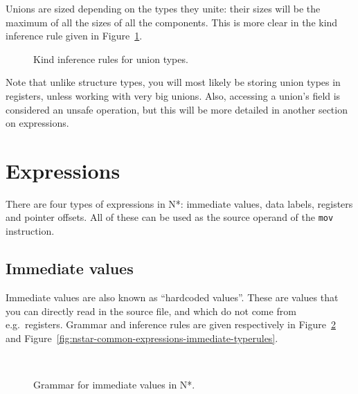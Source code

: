 Unions are sized depending on the types they unite: their sizes will be the maximum of all the sizes of all the components.
This is more clear in the kind inference rule given in Figure~\ref{fig:nstar-common-ts-unions-kindrules}.

\begin{figure}[htb]
  \centering

  \begin{prooftree}
  \end{prooftree}

  \caption{Kind inference rules for union types.}
  \label{fig:nstar-common-ts-unions-kindrules}
\end{figure}

Note that unlike structure types, you will most likely be storing union types in registers, unless working with very big unions.
Also, accessing a union's field is considered an unsafe operation, but this will be more detailed in another section on expressions.

\section{Expressions}\label{sec:nstar-common-expressions}

There are four types of expressions in N*: immediate values, data labels, registers and pointer offsets.
All of these can be used as the source operand of the \texttt{mov} instruction.

\subsection{Immediate values}\label{subsec:nstar-common-expressions-immediate}

Immediate values are also known as ``hardcoded values''.
These are values that you can directly read in the source file, and which do not come from e.g.\ registers.
Grammar and inference rules are given respectively in Figure~\ref{fig:nstar-common-expressions-immediate-grammar} and Figure~\ref{fig:nstar-common-expressions-immediate-typerules}.

\begin{figure}[H]
  \centering
  \\
  \caption{Grammar for immediate values in N*.}
  \label{fig:nstar-common-expressions-immediate-grammar}
\end{figure}

